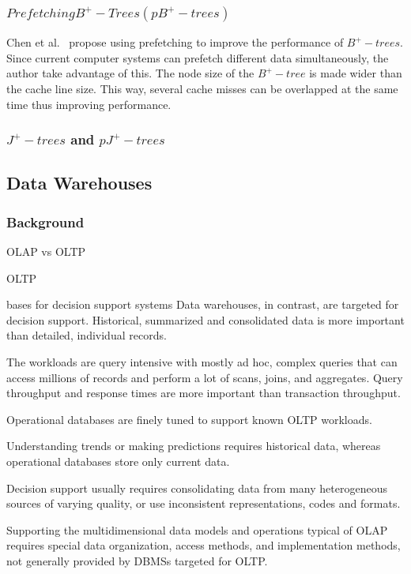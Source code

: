 \documentclass[12pt,a4paper]{article}
\begin{document}
\subsubsection*{$Prefetching B^{+}-Trees (pB^{+}-trees)$}

Chen et al.~\cite{chen2001improving} propose using prefetching to improve the performance of $B^{+}-trees$. Since current computer systems can prefetch different data simultaneously, the author take advantage of this. The node size of the $B^{+}-tree$ is made wider than the cache line size. This way, several cache misses can be overlapped at the same time thus improving performance.

\subsubsection*{$J^{+}-trees$ and $pJ^{+}-trees$}


\subsection{Data Warehouses}
\label{SEC-WAREHOUSES}
\subsubsection*{Background}

OLAP vs OLTP 

OLTP \cite{sen2005comparison}

bases for decision support systems \cite{248616}
Data warehouses, in contrast, are targeted for decision support. Historical, summarized and consolidated data is more important than detailed, individual records.

The workloads are query intensive with mostly ad hoc, complex queries that can access millions of records and perform a lot of scans, joins, and aggregates. Query throughput and response times are more important than transaction throughput.

Operational databases are finely tuned to support known OLTP workloads.

Understanding trends or making predictions requires historical data, whereas operational databases store only current data.

Decision support usually requires consolidating data from many heterogeneous sources of varying quality, or use inconsistent representations, codes and formats.

Supporting the multidimensional data models and operations typical of OLAP requires special data organization, access methods, and implementation methods, not generally provided by DBMSs targeted for OLTP.
\end{document}
